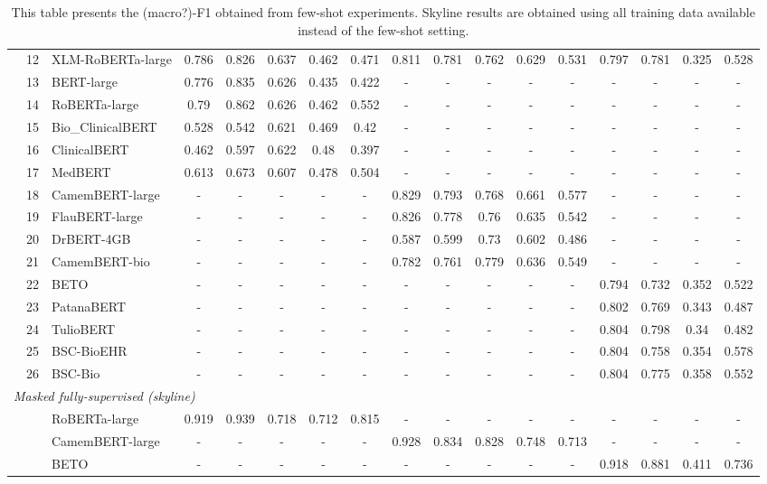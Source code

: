 \begin{table}[ht]
{\begin{tabular}{lll|ccccc|ccccc|cccc}
 & 12 & XLM-RoBERTa-large & 0.786 & 0.826 & 0.637 & 0.462 & 0.471 & 0.811 & 0.781 & 0.762 & 0.629 & 0.531 & 0.797 & 0.781 & 0.325 & 0.528 \\
 & 13 & BERT-large & 0.776 & 0.835 & 0.626 & 0.435 & 0.422 & - & - & - & - & - & - & - & - & - \\
 & 14 & RoBERTa-large & 0.79 & 0.862 & 0.626 & 0.462 & 0.552 & - & - & - & - & - & - & - & - & - \\
 & 15 & Bio\_ClinicalBERT & 0.528 & 0.542 & 0.621 & 0.469 & 0.42 & - & - & - & - & - & - & - & - & - \\
 & 16 & ClinicalBERT & 0.462 & 0.597 & 0.622 & 0.48 & 0.397 & - & - & - & - & - & - & - & - & - \\
 & 17 & MedBERT & 0.613 & 0.673 & 0.607 & 0.478 & 0.504 & - & - & - & - & - & - & - & - & - \\
 & 18 & CamemBERT-large & - & - & - & - & - & 0.829 & 0.793 & 0.768 & 0.661 & 0.577 & - & - & - & - \\
 & 19 & FlauBERT-large & - & - & - & - & - & 0.826 & 0.778 & 0.76 & 0.635 & 0.542 & - & - & - & - \\
 & 20 & DrBERT-4GB & - & - & - & - & - & 0.587 & 0.599 & 0.73 & 0.602 & 0.486 & - & - & - & - \\
 & 21 & CamemBERT-bio & - & - & - & - & - & 0.782 & 0.761 & 0.779 & 0.636 & 0.549 & - & - & - & - \\
 & 22 & BETO & - & - & - & - & - & - & - & - & - & - & 0.794 & 0.732 & 0.352 & 0.522 \\
 & 23 & PatanaBERT & - & - & - & - & - & - & - & - & - & - & 0.802 & 0.769 & 0.343 & 0.487 \\
 & 24 & TulioBERT & - & - & - & - & - & - & - & - & - & - & 0.804 & 0.798 & 0.34 & 0.482 \\
 & 25 & BSC-BioEHR & - & - & - & - & - & - & - & - & - & - & 0.804 & 0.758 & 0.354 & 0.578 \\
 & 26 & BSC-Bio & - & - & - & - & - & - & - & - & - & - & 0.804 & 0.775 & 0.358 & 0.552 \\
\midrule
\midrule
\multicolumn{17}{l}{\textit{Masked fully-supervised (skyline)}} \\
\midrule
 & & RoBERTa-large & 0.919 & 0.939 & 0.718 & 0.712 & 0.815 & - & - & - & - & - & - & - & - & - \\
 & & CamemBERT-large & - & - & - & - & - & 0.928 & 0.834 & 0.828 & 0.748 & 0.713 & - & - & - & - \\
 & & BETO & - & - & - & - & - & - & - & - & - & - & 0.918 & 0.881 & 0.411 & 0.736 \\
\bottomrule
\end{tabular}}\caption{This table presents the (macro?)-F1 obtained from few-shot experiments. Skyline results are obtained using all training data available instead of the few-shot setting.}
\label{tab:results}
\end{table}
